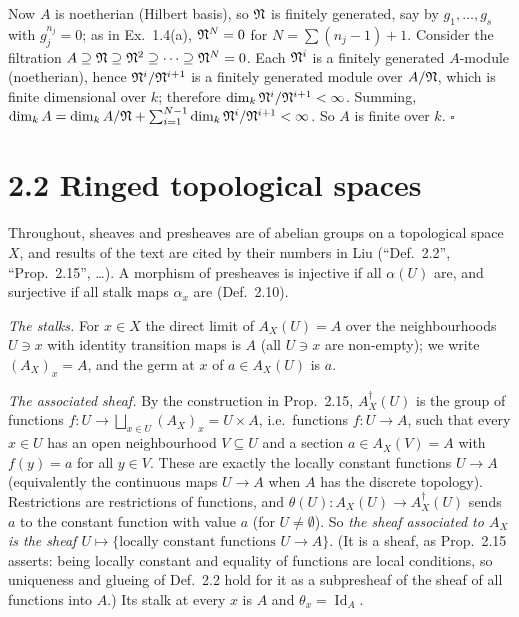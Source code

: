 \documentclass[11pt]{article}
\begin{document}
Now $A$ is noetherian (Hilbert basis), so $\mathfrak N$ is finitely generated, say by $g_1,\dots,g_s$ with $g_j^{n_j}=0$; as in Ex.~1.4(a), $\mathfrak N^N=0$ for $N=\sum(n_j-1)+1$. Consider the filtration $A\supseteq\mathfrak N\supseteq\mathfrak N^2\supseteq\dots\supseteq\mathfrak N^N=0$. Each $\mathfrak N^i$ is a finitely generated $A$-module (noetherian), hence $\mathfrak N^i/\mathfrak N^{i+1}$ is a finitely generated module over $A/\mathfrak N$, which is finite dimensional over $k$; therefore $\dim_k\mathfrak N^i/\mathfrak N^{i+1}<\infty$. Summing, $\dim_kA=\dim_kA/\mathfrak N+\sum_{i=1}^{N-1}\dim_k\mathfrak N^i/\mathfrak N^{i+1}<\infty$. So $A$ is finite over $k$. \hfill$\square$

\section*{2.2 Ringed topological spaces}

Throughout, sheaves and presheaves are of abelian groups on a topological space $X$, and results of the text are cited by their numbers in Liu (``Def.~2.2'', ``Prop.~2.15'', \dots). A morphism of presheaves is injective if all $\alpha(U)$ are, and surjective if all stalk maps $\alpha_x$ are (Def.~2.10).

\pf
\emph{The stalks.} For $x\in X$ the direct limit of $A_X(U)=A$ over the neighbourhoods $U\ni x$ with identity transition maps is $A$ (all $U\ni x$ are non-empty); we write $(A_X)_x=A$, and the germ at $x$ of $a\in A_X(U)$ is $a$.

\emph{The associated sheaf.} By the construction in Prop.~2.15, $A_X^\dagger(U)$ is the group of functions $f:U\to\bigsqcup_{x\in U}(A_X)_x=U\times A$, i.e.\ functions $f:U\to A$, such that every $x\in U$ has an open neighbourhood $V\subseteq U$ and a section $a\in A_X(V)=A$ with $f(y)=a$ for all $y\in V$. These are exactly the locally constant functions $U\to A$ (equivalently the continuous maps $U\to A$ when $A$ has the discrete topology). Restrictions are restrictions of functions, and $\theta(U):A_X(U)\to A_X^\dagger(U)$ sends $a$ to the constant function with value $a$ (for $U\neq\emptyset$). So \emph{the sheaf associated to $A_X$ is the sheaf $U\mapsto\{\text{locally constant functions }U\to A\}$}. (It is a sheaf, as Prop.~2.15 asserts: being locally constant and equality of functions are local conditions, so uniqueness and glueing of Def.~2.2 hold for it as a subpresheaf of the sheaf of all functions into $A$.) Its stalk at every $x$ is $A$ and $\theta_x=\operatorname{Id}_A$.
\end{document}
